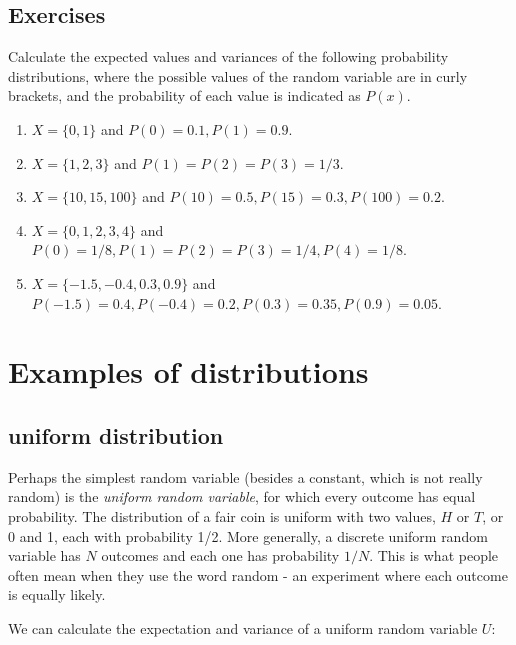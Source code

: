 \documentclass[
]{book}
\theoremstyle{definition}
\theoremstyle{definition}
\theoremstyle{definition}
\theoremstyle{remark}
\begin{document}
\hypertarget{exercises-21}{%
\subsection{Exercises}\label{exercises-21}}

Calculate the expected values and variances of the following probability distributions, where the possible values of the random variable are in curly brackets, and the probability of each value is indicated as \(P(x)\).

\begin{enumerate}
\def\labelenumi{\arabic{enumi}.}
\item
  \(X=\{0, 1\}\) and \(P(0) = 0.1, P(1) = 0.9\).
\item
  \(X=\{1,2,3\}\) and \(P(1) = P(2) = P(3)=1/3\).
\item
  \(X=\{10, 15, 100\}\) and \(P(10) = 0.5, P(15) = 0.3, P(100)=0.2\).
\item
  \(X=\{0, 1, 2, 3, 4\}\) and \(P(0) = 1/8, P(1) = P(2) = P(3) = 1/4, P(4) = 1/8\).
\item
  \(X=\{-1.5, -0.4, 0.3, 0.9\}\) and \(P(-1.5) = 0.4, P(-0.4) = 0.2, P(0.3) = 0.35, P(0.9) = 0.05\).
\end{enumerate}

\hypertarget{examples-of-distributions}{%
\section{Examples of distributions}\label{examples-of-distributions}}

\label{sec:math4_2}

\hypertarget{uniform-distribution}{%
\subsection{uniform distribution}\label{uniform-distribution}}

Perhaps the simplest random variable (besides a constant, which is not really random) is the \emph{uniform random variable}, for which every outcome has equal probability. The distribution of a fair coin is uniform with two values, \(H\) or \(T\), or 0 and 1, each with probability 1/2. More generally, a discrete uniform random variable has \(N\) outcomes and each one has probability \(1/N\). This is what people often mean when they use the word random - an experiment where each outcome is equally likely.

We can calculate the expectation and variance of a uniform random variable \(U\):
\end{document}
